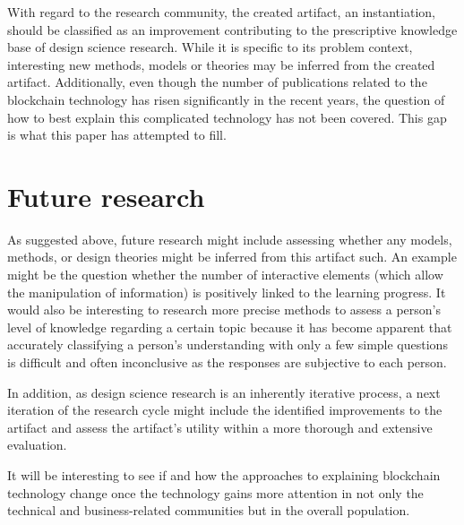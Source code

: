 With regard to the research community, the created artifact, an instantiation, should be classified as an improvement contributing to the prescriptive knowledge base of design science research. While it is specific to its problem context, interesting new methods, models or theories may be inferred from the created artifact. Additionally, even though the number of publications related to the blockchain technology has risen significantly in the recent years, the question of how to best explain this complicated technology has not been covered. This gap is what this paper has attempted to fill.

\section{Future research} \label{sec:FutureResearch}
As suggested above, future research might include assessing whether any models, methods, or design theories might be inferred from this artifact such. An example might be the question whether the number of interactive elements (which allow the manipulation of information) is positively linked to the learning progress. It would also be interesting to research more precise methods to assess a person's level of knowledge regarding a certain topic because it has become apparent that accurately classifying a person's understanding with only a few simple questions is difficult and often inconclusive as the responses are subjective to each person.

In addition, as design science research is an inherently iterative process, a next iteration of the research cycle might include the identified improvements to the artifact and assess the artifact's utility within a more thorough and extensive evaluation.

It will be interesting to see if and how the approaches to explaining blockchain technology change once the technology gains more attention in not only the technical and business-related communities but in the overall population.